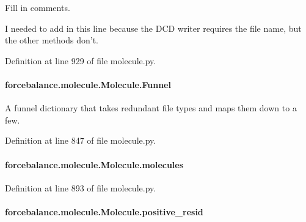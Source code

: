 Fill in comments. 

I needed to add in this line because the D\-C\-D writer requires the file name, but the other methods don't. 

Definition at line 929 of file molecule.\-py.

\hypertarget{classforcebalance_1_1molecule_1_1Molecule_a491b10f21e93f841a770088402a13924}{
\paragraph[{Funnel}]{\setlength{\rightskip}{0pt plus 5cm}forcebalance.\-molecule.\-Molecule.\-Funnel}}\label{classforcebalance_1_1molecule_1_1Molecule_a491b10f21e93f841a770088402a13924}


A funnel dictionary that takes redundant file types and maps them down to a few. 



Definition at line 847 of file molecule.\-py.

\hypertarget{classforcebalance_1_1molecule_1_1Molecule_a2537929702245aab6ab293c145730d7c}{
\paragraph[{molecules}]{\setlength{\rightskip}{0pt plus 5cm}forcebalance.\-molecule.\-Molecule.\-molecules}}\label{classforcebalance_1_1molecule_1_1Molecule_a2537929702245aab6ab293c145730d7c}


Definition at line 893 of file molecule.\-py.

\hypertarget{classforcebalance_1_1molecule_1_1Molecule_af9d8dc89fee54b2b89558633f2c9b70a}{
\paragraph[{positive\-\_\-resid}]{\setlength{\rightskip}{0pt plus 5cm}forcebalance.\-molecule.\-Molecule.\-positive\-\_\-resid}}\label{classforcebalance_1_1molecule_1_1Molecule_af9d8dc89fee54b2b89558633f2c9b70a}


